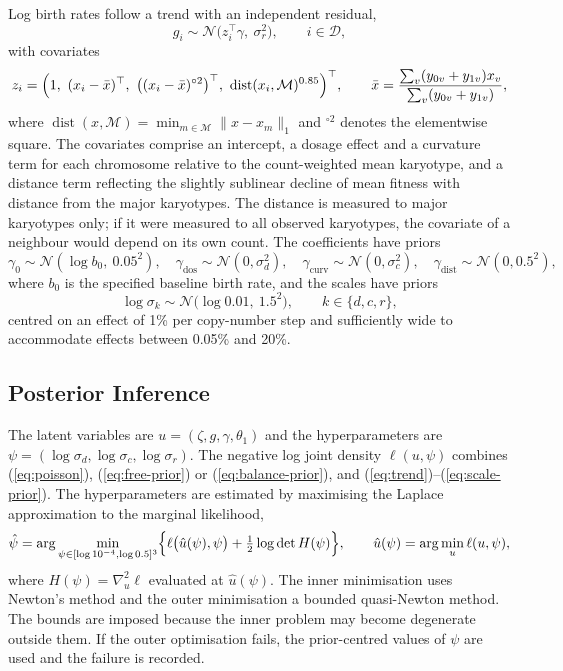 \documentclass[11pt]{article}
\newcommand{\Normal}{\mathcal{N}}
\begin{document}
Log birth rates follow a trend with an independent residual,
\begin{equation}
  g_i\sim\Normal\bigl(z_i^\top\gamma,\ \sigma_r^2\bigr),\qquad i\in\mathcal{D},
  \label{eq:trend}
\end{equation}
with covariates
\begin{equation}
  z_i=\Bigl(1,\ (x_i-\bar x)^\top,\ \bigl((x_i-\bar x)^{\circ2}\bigr)^\top,\
  \operatorname{dist}(x_i,\mathcal{M})^{0.85}\Bigr)^\top,
  \qquad
  \bar x=\frac{\sum_v(y_{0v}+y_{1v})x_v}{\sum_v(y_{0v}+y_{1v})},
  \label{eq:design}
\end{equation}
where $\operatorname{dist}(x,\mathcal{M})=\min_{m\in\mathcal{M}}\|x-x_m\|_1$
and $^{\circ2}$ denotes the elementwise square. The covariates comprise an
intercept, a dosage effect and a curvature term for each chromosome relative
to the count-weighted mean karyotype, and a distance term reflecting the
slightly sublinear decline of mean fitness with distance from the major
karyotypes. The distance is measured to major karyotypes only; if it were
measured to all observed karyotypes, the covariate of a neighbour would depend
on its own count. The coefficients have priors
\begin{equation}
  \gamma_0\sim\Normal(\log b_0,\ 0.05^2),\quad
  \gamma_{\mathrm{dos}}\sim\Normal(0,\sigma_d^2),\quad
  \gamma_{\mathrm{curv}}\sim\Normal(0,\sigma_c^2),\quad
  \gamma_{\mathrm{dist}}\sim\Normal(0,0.5^2),
  \label{eq:coef-prior}
\end{equation}
where $b_0$ is the specified baseline birth rate, and the scales have priors
\begin{equation}
  \log\sigma_k\sim\Normal\bigl(\log 0.01,\ 1.5^2\bigr),\qquad k\in\{d,c,r\},
  \label{eq:scale-prior}
\end{equation}
centred on an effect of 1\% per copy-number step and sufficiently wide to
accommodate effects between 0.05\% and 20\%.

\subsection{Posterior Inference}
\label{sec:sj-inference}

The latent variables are $u=(\zeta,g,\gamma,\theta_1)$ and the
hyperparameters are $\psi=(\log\sigma_d,\log\sigma_c,\log\sigma_r)$. The
negative log joint density $\ell(u,\psi)$ combines (\ref{eq:poisson}),
(\ref{eq:free-prior}) or (\ref{eq:balance-prior}), and
(\ref{eq:trend})--(\ref{eq:scale-prior}). The hyperparameters are estimated
by maximising the Laplace approximation to the marginal likelihood,
\begin{equation}
  \hat\psi=\arg\min_{\psi\in[\log10^{-4},\log0.5]^3}
  \Bigl\{\ell\bigl(\hat u(\psi),\psi\bigr)+\tfrac12\log\det H(\psi)\Bigr\},
  \qquad
  \hat u(\psi)=\arg\min_u\ell(u,\psi),
  \label{eq:laplace}
\end{equation}
where $H(\psi)=\nabla_u^2\ell$ evaluated at $\hat u(\psi)$. The inner
minimisation uses Newton's method and the outer minimisation a bounded
quasi-Newton method. The bounds are imposed because the inner problem may
become degenerate outside them. If the outer optimisation fails, the
prior-centred values of $\psi$ are used and the failure is recorded.
\end{document}
